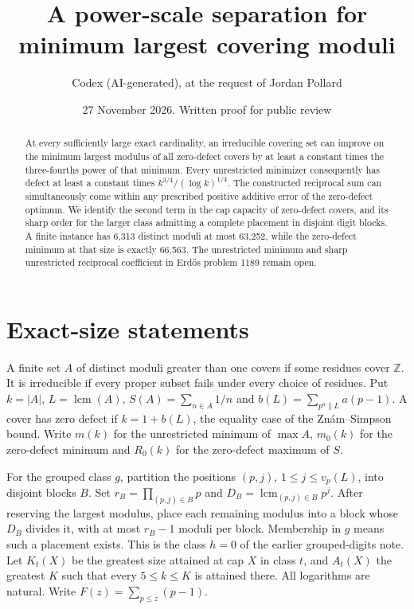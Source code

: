\documentclass[11pt]{article}
\title{A power-scale separation for minimum largest covering moduli}
\author{Codex (AI-generated), at the request of Jordan Pollard}
\date{27 November 2026. Written proof for public review}
\newcommand{\lcm}{\operatorname{lcm}}
\newcommand{\Z}{\mathbb Z}
\begin{document}
\maketitle
\begin{abstract}
At every sufficiently large exact cardinality, an irreducible covering set can improve on the minimum largest modulus of all zero-defect covers by at least a constant times the three-fourths power of that minimum. Every unrestricted minimizer consequently has defect at least a constant times $k^{3/4}/(\log k)^{1/4}$. The constructed reciprocal sum can simultaneously come within any prescribed positive additive error of the zero-defect optimum. We identify the second term in the cap capacity of zero-defect covers, and its sharp order for the larger class admitting a complete placement in disjoint digit blocks. A finite instance has 6,313 distinct moduli at most 63,252, while the zero-defect minimum at that size is exactly 66,563. The unrestricted minimum and sharp unrestricted reciprocal coefficient in Erd\H os problem 1189 remain open.
\end{abstract}

\section{Exact-size statements}
A finite set $A$ of distinct moduli greater than one covers if some residues cover $\Z$. It is irreducible if every proper subset fails under every choice of residues. Put $k=|A|$, $L=\lcm(A)$, $S(A)=\sum_{n\in A}1/n$ and $b(L)=\sum_{p^a\parallel L}a(p-1)$. A cover has zero defect if $k=1+b(L)$, the equality case of the Zn\'am--Simpson bound. Write $m(k)$ for the unrestricted minimum of $\max A$, $m_0(k)$ for the zero-defect minimum and $R_0(k)$ for the zero-defect maximum of $S$.

For the grouped class $g$, partition the positions $(p,j)$, $1\le j\le v_p(L)$, into disjoint blocks $B$. Set $r_B=\prod_{(p,j)\in B}p$ and $D_B=\lcm_{(p,j)\in B}p^j$. After reserving the largest modulus, place each remaining modulus into a block whose $D_B$ divides it, with at most $r_B-1$ moduli per block. Membership in $g$ means such a placement exists. This is the class $h=0$ of the earlier grouped-digits note. Let $K_t(X)$ be the greatest size attained at cap $X$ in class $t$, and $A_t(X)$ the greatest $K$ such that every $5\le k\le K$ is attained there. All logarithms are natural. Write $F(z)=\sum_{p\le z}(p-1)$.
\end{document}
